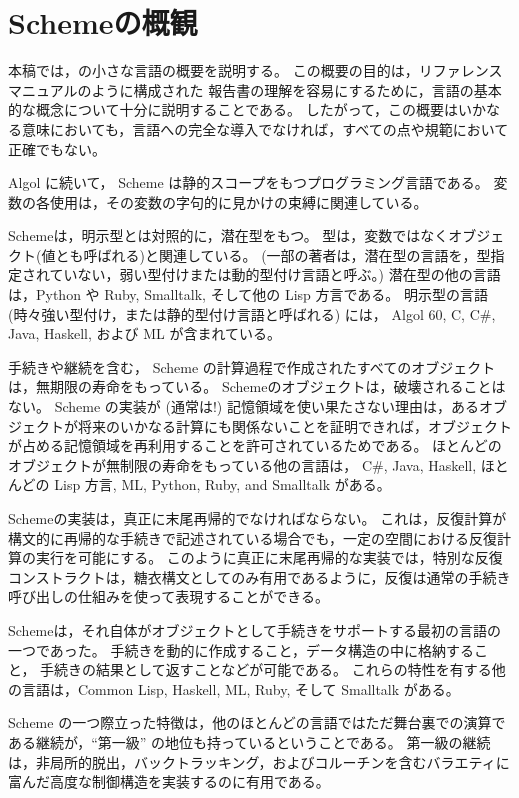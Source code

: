 \chapter*{Schemeの概観}

本稿では，\rsevenrs の小さな言語の概要を説明する。
この概要の目的は，リファレンスマニュアルのように構成された \rsevenrs{} 報告書の理解を容易にするために，言語の基本的な概念について十分に説明することである。
したがって，この概要はいかなる意味においても，言語への完全な導入でなければ，すべての点や規範において正確でもない。

\vest Algol に続いて， Scheme は静的スコープをもつプログラミング言語である。
変数の各使用は，その変数の字句的に見かけの束縛に関連している。

\vest Schemeは，明示型とは対照的に，潜在型をもつ。
型は，変数ではなくオブジェクト(値とも呼ばれる)と関連している。
(一部の著者は，潜在型の言語を，型指定されていない，弱い型付けまたは動的型付け言語と呼ぶ。)
潜在型の他の言語は，Python や Ruby, Smalltalk, そして他の Lisp 方言である。
明示型の言語 (時々強い型付け，または静的型付け言語と呼ばれる) には， Algol 60, C, C\#, Java, Haskell, および ML が含まれている。

\vest 手続きや継続を含む， Scheme の計算過程で作成されたすべてのオブジェクトは，無期限の寿命をもっている。
Schemeのオブジェクトは，破壊されることはない。
Scheme の実装が (通常は!) 記憶領域を使い果たさない理由は，あるオブジェクトが将来のいかなる計算にも関係ないことを証明できれば，オブジェクトが占める記憶領域を再利用することを許可されているためである。
ほとんどのオブジェクトが無制限の寿命をもっている他の言語は， C\#, Java, Haskell, ほとんどの Lisp 方言, ML, Python, Ruby, and Smalltalk がある。

Schemeの実装は，真正に末尾再帰的でなければならない。
これは，反復計算が構文的に再帰的な手続きで記述されている場合でも，一定の空間における反復計算の実行を可能にする。
このように真正に末尾再帰的な実装では，特別な反復コンストラクトは，糖衣構文としてのみ有用であるように，反復は通常の手続き呼び出しの仕組みを使って表現することができる。

\vest Schemeは，それ自体がオブジェクトとして手続きをサポートする最初の言語の一つであった。
手続きを動的に作成すること，データ構造の中に格納すること，
手続きの結果として返すことなどが可能である。
これらの特性を有する他の言語は，Common Lisp, Haskell, ML, Ruby, そして Smalltalk がある。

\vest Scheme の一つ際立った特徴は，他のほとんどの言語ではただ舞台裏での演算である継続が，``第一級'' の地位も持っているということである。
第一級の継続は，非局所的脱出，バックトラッキング，およびコルーチンを含むバラエティに富んだ高度な制御構造を実装するのに有用である。

